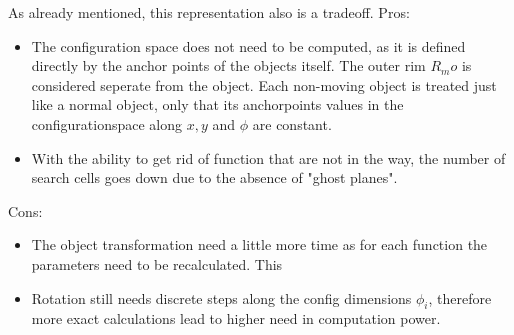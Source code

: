 As already mentioned, this representation also is a tradeoff.
Pros:
\begin{itemize}
\item The configuration space does not need to be computed, as it is defined directly by the anchor points of the objects itself. The outer rim $R_mo$ is considered seperate from the object. Each non-moving object is treated just like a normal object, only that its anchorpoints values in the configurationspace along $x,y$ and $\phi$ are constant.
\item With the ability to get rid of function that are not in the way, the number of search cells goes down due to the absence of "ghost planes".
\end{itemize}
Cons:\\
\begin{itemize}
\item The object transformation need a little more time as for each function the parameters need to be recalculated. This 
\item Rotation still needs discrete steps along the config dimensions $\phi_i$, therefore more exact calculations lead to higher need in computation power.
\end{itemize}
